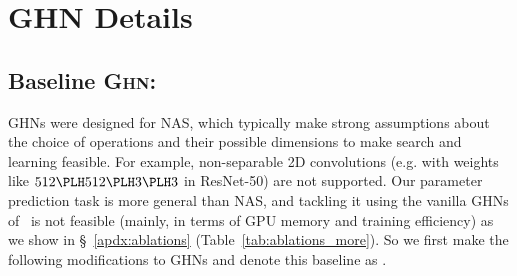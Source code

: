 \section{GHN Details\label{apdx:ghn_bg}}

\subsection{Baseline \textsc{Ghn}: \ghnbase\label{apdx:ghn_1}}

GHNs were designed for NAS, which typically make strong assumptions about the choice of operations and their possible dimensions to make search and learning feasible. For example, non-separable 2D convolutions (e.g. with weights like $512 \PLH 512 \PLH 3 \PLH 3$ in ResNet-50) are not supported. Our parameter prediction task is more general than NAS, and tackling it using the vanilla GHNs of~\cite{zhang2018graph} is not feasible (mainly, in terms of GPU memory and training efficiency) as we show in \S~\ref{apdx:ablations} (Table~\ref{tab:ablations_more}). So we first make the following modifications to GHNs and denote this baseline as \ghnbase.


